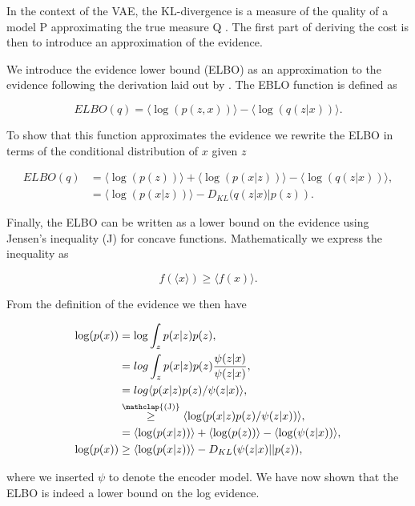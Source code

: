 \noindent In the context of the VAE, the KL-divergence is a measure of the quality of a model P approximating the true measure Q \cite{Burnham2002}. The first part of deriving the cost is then to introduce an approximation of the evidence. 

We introduce the evidence lower bound (ELBO) as an approximation to the evidence following the derivation laid out by \citet{Kingma2013}. The EBLO function is defined as 

\begin{equation}\label{eq:elbo}
ELBO(q) = \langle \log(p(z, x)) \rangle - \langle \log(q(z|x)) \rangle.
\end{equation}

\noindent To show that this function approximates the evidence we rewrite the ELBO in terms of the conditional distribution of $x$ given $z$

\begin{align}
ELBO(q) &= \langle \log(p(z)) \rangle +  \langle \log(p(x|z)) \rangle - \langle \log(q(z|x)) \rangle, \\
&=   \langle \log(p(x|z)) \rangle - D_{KL}(q(z|x) | p(z)).
\end{align}

\noindent Finally, the ELBO can be written as a lower bound on the evidence using Jensen's inequality (J) for concave functions. Mathematically we express the inequality as 

\begin{equation}
f(\langle x\rangle) \geq \langle f(x) \rangle.
\end{equation}

\noindent From the definition of the evidence we then have

\begin{align}
\log (p(x)) &= \log \int_z p(x|z) p(z), \\
&= log \int _z p(x|z) p(z) \frac{\psi(z|x)}{\psi(z|x)},\\
& = log \langle p(x|z) p(z)/ \psi (z|x) \rangle, \\
&  \stackrel{\mathclap{\text{(J)}}}{\geq} \langle \log (p(x|z) p(z)/ \psi(z|x))\rangle,\\
& = \langle \log(p(x|z))\rangle + \langle \log(p(z))\rangle  - \langle \log(\psi (z|x))\rangle, \\
\log (p (x)) &\geq \langle \log(p(x|z))\rangle - D_{KL}(\psi (z|x) || p(z)),
\end{align}

\noindent where we inserted $\psi$ to denote the encoder model. We have now shown that the ELBO is indeed a lower bound on the log evidence. 

